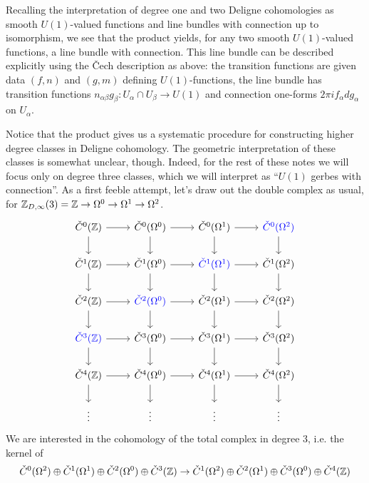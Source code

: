 \documentclass{amsart}
\begin{document}
Recalling the interpretation of degree one and two Deligne cohomologies as smooth $U(1)$-valued
functions and line bundles with connection up to isomorphism, we see that the product yields,
for any two smooth $U(1)$-valued functions, a line bundle with connection. This line bundle
can be described explicitly using the \v Cech description as above:
the transition functions are given data $(f,n)$ and $(g,m)$ defining
$U(1)$-functions, the line bundle has transition functions $n_{\alpha\beta}g_\beta:U_\alpha\cap U_\beta\to U(1)$
and connection one-forms $2\pi i f_\alpha dg_\alpha$ on $U_\alpha$.

Notice that the product gives us a systematic procedure for constructing higher degree
classes in Deligne cohomology. The geometric interpretation of these classes is
somewhat unclear, though. Indeed, for the rest of these notes we will focus only on
degree three classes, which we will interpret as ``$U(1)$ gerbes with connection''.
As a first feeble attempt, let's draw out the double complex as usual,
for $\mathbb{Z}_{D,\infty}(3)=\mathbb{Z}\to\Omega^0\to\Omega^1\to\Omega^2$.
\begin{equation*}
    \begin{tikzcd}
        \check C^0(\Z) \rar\dar & \check C^0(\Omega^0)\dar\rar & \check C^0(\Omega^1)\dar\rar & {\color{blue}\check C^0(\Omega^2)}\dar\\
        \check C^1(\Z) \rar\dar & \check C^1(\Omega^0)\dar\rar & {\color{blue}\check C^1(\Omega^1)\dar\rar} & \check C^1(\Omega^2)\dar\\
        \check C^2(\Z) \rar\dar & {\color{blue}\check C^2(\Omega^0)\dar\rar} & \check C^2(\Omega^1)\dar\rar & \check C^2(\Omega^2)\dar\\
        {\color{blue}\check C^3(\Z) \rar\dar} & \check C^3(\Omega^0)\dar\rar & \check C^3(\Omega^1)\dar\rar & \check C^3(\Omega^2)\dar\\
        \check C^4(\Z) \rar\dar & \check C^4(\Omega^0)\dar\rar & \check C^4(\Omega^1)\dar\rar & \check C^4(\Omega^2)\dar\\
        \vdots & \vdots & \vdots & \vdots
    \end{tikzcd}
\end{equation*}
We are interested in the cohomology of the total complex in degree 3, i.e. the kernel of
\begin{equation*}
    \check C^0(\Omega^2) \oplus \check C^1(\Omega^1) \oplus \check C^2(\Omega^0) \oplus \check C^3(\mathbb{Z}) \to
    \check C^1(\Omega^2) \oplus \check C^2(\Omega^1) \oplus \check C^3(\Omega^0) \oplus \check C^4(\mathbb{Z})
\end{equation*}
\end{document}

